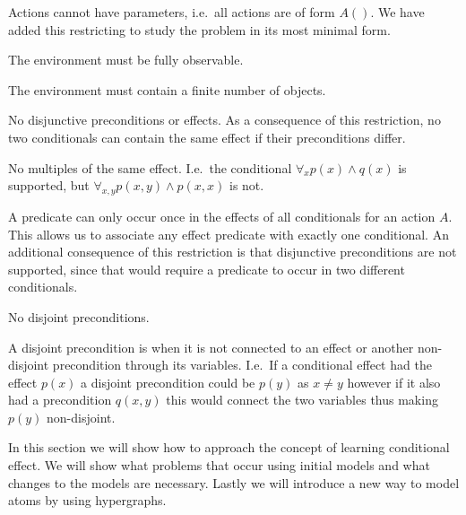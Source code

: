 \documentclass[\master/Master.tex]{subfiles}
\begin{document}
\begin{arestriction}\leavevmode
\begin{propenum}[label=R.\arabic*]
	\item Actions cannot have parameters, i.e.\ all actions are of form $A()$. 
	We have added this restricting to study the problem in its most minimal form.	
	\item The environment must be fully observable.
	\item The environment must contain a finite number of objects.
	\item \label{rst:ca:no-disjuntive-conditionals} No disjunctive preconditions or effects. As a consequence of this restriction, no two conditionals can contain the same effect if their preconditions differ.
	\item \label{rst:ca:no-multiple-effect} No multiples of the same effect. I.e.\ the conditional $\forall_x p(x) \land q(x)$ is supported, but $\forall_{x, y} p(x, y) \land p(x, x) $ is not.

    \item \label{rst:ca:no-disjuntive-conditionals} \label{rst:ca:no-multiple-effect} A predicate can only occur once in the effects of all conditionals for an action $A$. This allows us to associate any effect predicate with exactly one conditional. An additional consequence of this restriction is that disjunctive preconditions are not supported, since that would require a predicate to occur in two different conditionals.

	\item \label{rst:ca:no-disjoint-preconditions} No disjoint preconditions.

		  A disjoint precondition is when it is not connected to an effect or another non-disjoint precondition through its variables.
		  I.e.\ If a conditional effect had the effect $p(x)$ a disjoint precondition could be $p(y)$ as $x \neq y$ however if it also had a precondition $q(x,y)$ this would connect the two variables thus making $p(y)$ non-disjoint.
\end{propenum}
\end{arestriction}

%

In this section we will show how to approach the concept of learning conditional effect. We will show what problems that occur using initial models and what changes to the models are necessary. Lastly we will introduce a new way to model atoms by using hypergraphs.
\end{document}
